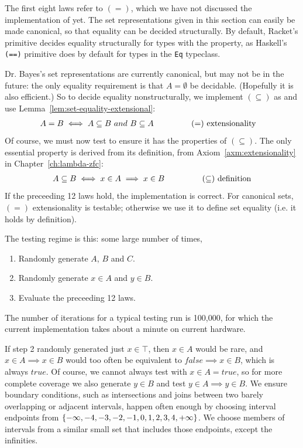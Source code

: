 The first eight laws refer to $(=)$, which we have not discussed the implementation of yet.
The set representations given in this section can easily be made canonical, so that equality can be decided structurally.
By default, Racket's  primitive decides equality structurally for types with the  property, as Haskell's \texttt{(==)} primitive does by default for types in the \texttt{Eq} typeclass.

Dr. Bayes's set representations are currently canonical, but may not be in the future: the only equality requirement is that $A = \emptyset$ be decidable.
(Hopefully it is also efficient.)
So to decide equality nonstructurally, we implement $(\subseteq)$ as  and use Lemma~\ref{lem:set-equality-extensional}:
\begin{equation}
\begin{aligned}
	&A = B \iff A \subseteq B~and~B \subseteq A
	\hspace{0.5in} &&\text{$(=)$ extensionality}
\end{aligned}
\end{equation}
Of course, we must now test  to ensure it has the properties of $(\subseteq)$.
The only essential property is derived from its definition, from Axiom~\ref{axm:extensionality} in Chapter~\ref{ch:lambda-zfc}:
\begin{equation}
\begin{aligned}
	A \subseteq B \iff x \in A \implies x \in B
	\hspace{0.5in} &&\text{$(\subseteq)$ definition}
\end{aligned}
\end{equation}
If the preceeding 12 laws hold, the implementation is correct.
For canonical sets, $(=)$ extensionality is testable; otherwise we use it to define set equality (i.e. it holds by definition).

The testing regime is this: some large number of times,
\begin{enumerate}
	\item Randomly generate $A$, $B$ and $C$.
	\item Randomly generate $x \in A$ and $y \in B$.
	\item Evaluate the preceeding 12 laws.
\end{enumerate}
The number of iterations for a typical testing run is 100,000, for which the current implementation takes about a minute on current hardware.

If step 2 randomly generated just $x \in \top$, then $x \in A$ would be rare, and $x \in A \implies x \in B$ would too often be equivalent to $false \implies x \in B$, which is always $true$.
Of course, we cannot always test with $x \in A = true$, so for more complete coverage we also generate $y \in B$ and test $y \in A \implies y \in B$.
We ensure boundary conditions, such as intersections and joins between two barely overlapping or adjacent intervals, happen often enough by choosing interval endpoints from $\{{-\infty,-4,-3,-2,-1,0,1,2,3,4,+\infty}\}$.
We choose members of intervals from a similar small set that includes those endpoints, except the infinities.

